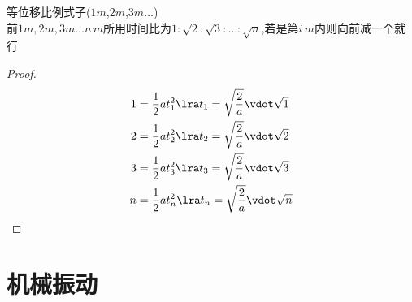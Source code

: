 \documentclass{article}
\begin{document}
\begin{corollary*}
    等位移比例式子($1m$,$2m$,$3m \dots$)    \\
    前$1m,2m,3m \dots n \, m$所用时间比为$1:\sqrt{2}:\sqrt{3}:\dots:\sqrt{n}$,若是第$i\,m$内则向前减一个就行
    \begin{proof}
        \begin{align*}
            1 & = \frac{1}{2}a t_{1}^{2} \lra t_{1} =\sqrt{\frac{2}{a}} \vdot \sqrt{1} \\
            2 & = \frac{1}{2}a t_{2}^{2} \lra t_{2} =\sqrt{\frac{2}{a}} \vdot \sqrt{2} \\
            3 & = \frac{1}{2}a t_{3}^{2} \lra t_{3} =\sqrt{\frac{2}{a}} \vdot \sqrt{3} \\
            n & = \frac{1}{2}a t_{n}^{2} \lra t_{n} =\sqrt{\frac{2}{a}} \vdot \sqrt{n} \\
        \end{align*}
    \end{proof}
\end{corollary*}

\vspace{2em}

\section{机械振动}
\end{document}
